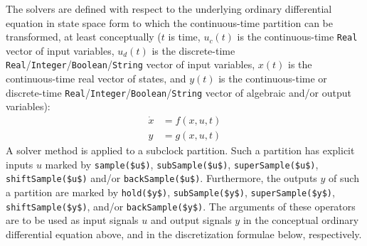 The solvers are defined with respect to the underlying ordinary
differential equation in state space form to which the continuous-time
partition can be transformed, at least conceptually ($t$ is time,
$u_{c}(t)$ is the continuous-time \lstinline!Real! vector
of input variables, $u_{d}(t)$ is the
discrete-time \lstinline!Real!/\lstinline!Integer!/\lstinline!Boolean!/\lstinline!String! vector of input variables,
$x(t)$ is the continuous-time real vector of states, and
$y(t)$ is the continuous-time or discrete-time
\lstinline!Real!/\lstinline!Integer!/\lstinline!Boolean!/\lstinline!String! vector of algebraic and/or output variables):
\begin{align*}
\dot{x} &= f(x, u, t)\\
y &= g(x, u, t)
\end{align*}
A solver method is applied to a subclock partition. Such a partition has
explicit inputs $u$ marked by \lstinline!sample($u$)!,
\lstinline!subSample($u$)!, \lstinline!superSample($u$)!, \lstinline!shiftSample($u$)!
and/or \lstinline!backSample($u$)!. Furthermore, the outputs $y$ of
such a partition are marked by \lstinline!hold($y$)!, \lstinline!subSample($y$)!,
\lstinline!superSample($y$)!, \lstinline!shiftSample($y$)!, and/or
\lstinline!backSample($y$)!. The arguments of these operators are to be used
as input signals $u$ and output signals $y$ in the
conceptual ordinary differential equation above, and in the
discretization formulae below, respectively.

